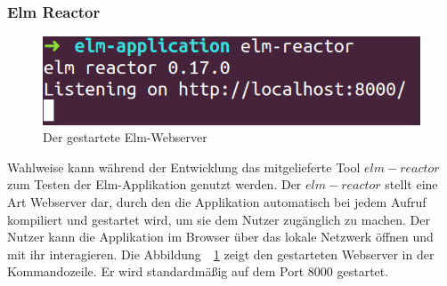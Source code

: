 \subsubsection{Elm Reactor}
\label{sec:elm-reactor}
\begin{figure}[h]
\centering
\includegraphics[scale=0.5]{img/elm-reactor.png}
\caption{Der gestartete Elm-Webserver}\label{fig:elm-reactor}
\end{figure}
Wahlweise kann während der Entwicklung das mitgelieferte Tool $elm-reactor$ zum Testen der Elm-Applikation genutzt werden. Der $elm-reactor$ stellt eine Art Webserver dar, durch den die Applikation automatisch bei jedem Aufruf kompiliert und gestartet wird, um sie dem Nutzer zugänglich zu machen. Der Nutzer kann die Applikation im Browser über das lokale Netzwerk öffnen und mit ihr interagieren. Die Abbildung~~\ref{fig:elm-reactor} zeigt den gestarteten Webserver in der Kommandozeile. Er wird standardmäßig auf dem Port $8000$ gestartet.

